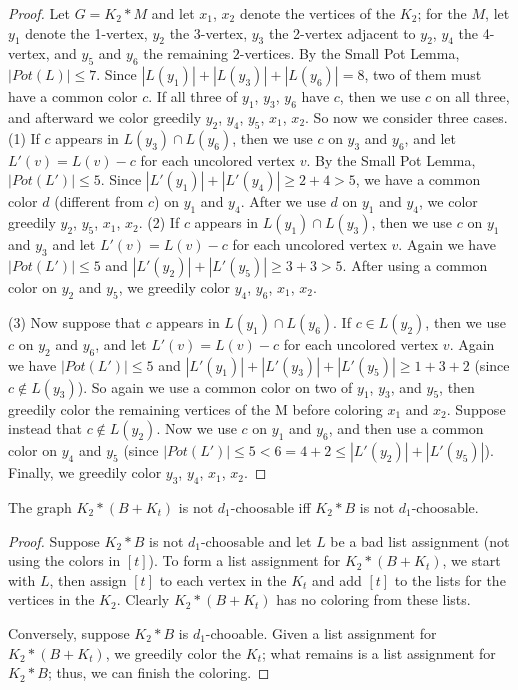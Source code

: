 \begin{proof}
Let $G=K_2*M$ and let $x_1$, $x_2$ denote the vertices of the $K_2$; for the
$M$, let $y_1$ denote the 1-vertex, $y_2$ the 3-vertex, $y_3$ the
2-vertex adjacent to $y_2$, $y_4$ the 4-vertex, and $y_5$ and $y_6$
the remaining $2$-vertices.  By the Small Pot Lemma, $|Pot(L)| \le 7$.
Since $|L(y_1)|+|L(y_3)|+|L(y_6)|=8$, two of them must have a common color $c$.
If all three of $y_1$, $y_3$, $y_6$ have $c$, then we use $c$ on all three, and
afterward we color greedily $y_2$, $y_4$, $y_5$, $x_1$, $x_2$.  So now we
consider three cases.  (1) If $c$ appears in $L(y_3)\cap L(y_6)$, then we use
$c$ on $y_3$ and $y_6$, and let $L'(v)=L(v)-c$ for each uncolored vertex $v$.
By the Small Pot Lemma, $|Pot(L')| \le 5$.  Since $|L'(y_1)|+|L'(y_4)|\ge
2+4>5$, we have a common color $d$ (different from $c$) on $y_1$ and $y_4$.
After we use $d$ on $y_1$ and $y_4$, we color greedily $y_2$, $y_5$, $x_1$,
$x_2$.  (2) If $c$ appears in $L(y_1)\cap L(y_3)$, then we use $c$ on $y_1$ and
$y_3$ and let $L'(v)=L(v)-c$ for each uncolored vertex $v$.  Again we have
$|Pot(L')|\le 5$ and $|L'(y_2)|+|L'(y_5)|\ge 3+3 > 5$.  After using a common
color on $y_2$ and $y_5$, we greedily color $y_4$, $y_6$, $x_1$, $x_2$.

(3) Now suppose that $c$ appears in $L(y_1)\cap L(y_6)$.  If $c\in L(y_2)$, then
we use $c$ on $y_2$ and $y_6$, and let $L'(v)=L(v)-c$ for each uncolored vertex
$v$.  Again we have $|Pot(L')| \le 5$ and $|L'(y_1)|+|L'(y_3)|+|L'(y_5)|\ge 1
+3+2$ (since $c\notin L(y_3)$).  So again we use a common color on two of $y_1$,
$y_3$, and $y_5$, then greedily color the remaining vertices of the M before
coloring $x_1$ and $x_2$.  Suppose instead that $c\notin L(y_2)$.  Now we use
$c$ on $y_1$ and $y_6$, and then use a common color on $y_4$ and $y_5$ (since
$|Pot(L')|\le 5 < 6 = 4 + 2 \le |L'(y_2)|+|L'(y_5)|$).  Finally, we greedily
color $y_3$, $y_4$, $x_1$, $x_2$.
\end{proof}
\begin{lem}
The graph $K_2*(B+K_t)$ is not $d_1$-choosable iff $K_2*B$ is not
$d_1$-choosable.
\end{lem}
\begin{proof}
Suppose $K_2*B$ is not $d_1$-choosable and let $L$ be a bad list assignment (not
using the colors in $[t]$).  To form a list assignment for $K_2*(B+K_t)$, we
start with $L$, then assign $[t]$ to each vertex in the $K_t$ and add $[t]$ to
the lists for the vertices in the $K_2$.  Clearly $K_2*(B+K_t)$ has no coloring
from these lists.

Conversely, suppose $K_2*B$ is $d_1$-chooable.  Given a list assignment for
$K_2*(B+K_t)$, we greedily color the $K_t$; what remains is a list assignment
for $K_2*B$; thus, we can finish the coloring.
\end{proof}

